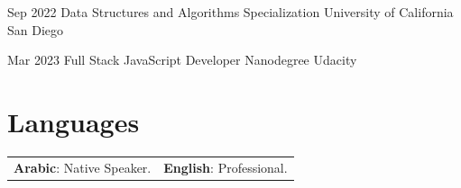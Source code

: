 \documentclass[11pt,a4paper,sans]{moderncv}
\begin{document}
\cventry
  {Sep 2022}
  {Data Structures and Algorithms Specialization}
  {University of California San Diego}
  {}
  {}
  {}

\vspace*{0.2cm}

\cventry
  {Mar 2023}
  {Full Stack JavaScript Developer Nanodegree}
  {Udacity}
  {}
  {}
  {}

\section{Languages}
\noindent\begin{tabular}{@{}p{.5\linewidth}@{}p{.5\linewidth}@{}}
\textbf{Arabic}: Native Speaker. & \textbf{English}: Professional.
\end{tabular}
\end{document}

